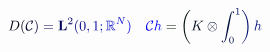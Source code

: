 \documentclass[12pt]{article}
\begin{document}
\makeatletter
\renewcommand*{\@textcolor}[3]{%
  \protect\leavevmode
  \begingroup
    \color#1{#2}#3%
  \endgroup
}
\makeatother
\begin{displaymath}
\mathcolor[RGB]{0,0,15}{D} \mathcolor[RGB]{0,0,30}{(} \mathcal { \mathcolor[RGB]{0,0,45}{C} } \mathcolor[RGB]{0,0,60}{)} \mathcolor[RGB]{0,0,75}{=} \mathbf { \mathcolor[RGB]{0,0,90}{L} } ^ { \mathcolor[RGB]{0,0,105}{2} } \mathcolor[RGB]{0,0,120}{(} \mathcolor[RGB]{0,0,135}{0} \mathcolor[RGB]{0,0,150}{,} \mathcolor[RGB]{0,0,165}{1} \mathcolor[RGB]{0,0,180}{;} \mathbb { \mathcolor[RGB]{0,0,195}{R} } ^ { \mathcolor[RGB]{0,0,210}{N} } \mathcolor[RGB]{0,0,225}{)} \quad \mathcal { \mathcolor[RGB]{0,0,240}{C} } \mathcolor[RGB]{0,0,255}{h} \mathcolor[RGB]{0,15,0}{=} \mathcolor[RGB]{0,15,15}{\left(} \mathcolor[RGB]{0,15,30}{K} \mathcolor[RGB]{0,15,45}{\otimes} \mathcolor[RGB]{0,15,60}{\int} _ { \mathcolor[RGB]{0,15,75}{0} } ^ { \mathcolor[RGB]{0,15,90}{1} } \mathcolor[RGB]{0,15,105}{\right)} \mathcolor[RGB]{0,15,120}{h}
\end{displaymath}
\end{document}
